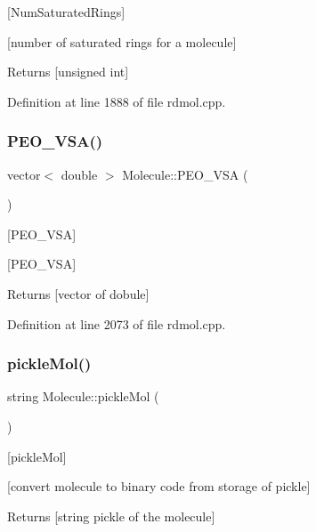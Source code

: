 \mbox{[}Num\+Saturated\+Rings\mbox{]} 

\mbox{[}number of saturated rings for a molecule\mbox{]}

\begin{DoxyReturn}{Returns}
\mbox{[}unsigned int\mbox{]} 
\end{DoxyReturn}


Definition at line 1888 of file rdmol.\+cpp.

\mbox{\label{class_molecule_a7af6b3bc2840250b9e9aac63067a4b3d}} 
\subsubsection{\texorpdfstring{P\+E\+O\+\_\+\+V\+S\+A()}{PEO\_VSA()}}
{\footnotesize\ttfamily vector$<$ double $>$ Molecule\+::\+P\+E\+O\+\_\+\+V\+SA (\begin{DoxyParamCaption}{ }\end{DoxyParamCaption})}



\mbox{[}P\+E\+O\+\_\+\+V\+SA\mbox{]} 

\mbox{[}P\+E\+O\+\_\+\+V\+SA\mbox{]}

\begin{DoxyReturn}{Returns}
\mbox{[}vector of dobule\mbox{]} 
\end{DoxyReturn}


Definition at line 2073 of file rdmol.\+cpp.

\mbox{\label{class_molecule_a24d8a0ae44766a09fa4f245f61a22dc2}} 
\subsubsection{\texorpdfstring{pickle\+Mol()}{pickleMol()}}
{\footnotesize\ttfamily string Molecule\+::pickle\+Mol (\begin{DoxyParamCaption}{ }\end{DoxyParamCaption})}



\mbox{[}pickle\+Mol\mbox{]} 

\mbox{[}convert molecule to binary code from storage of pickle\mbox{]} \begin{DoxyReturn}{Returns}
\mbox{[}string pickle of the molecule\mbox{]} 
\end{DoxyReturn}


